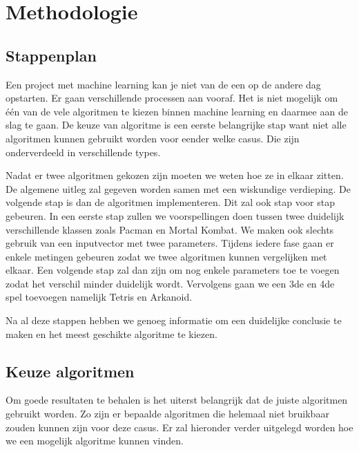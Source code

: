 
\chapter{Methodologie}
\label{ch:methodologie}


\section{Stappenplan}
\label{sec:stappenplan}
Een project met machine learning kan je niet van de een op de andere dag opstarten. Er gaan verschillende processen aan vooraf. Het is niet mogelijk om één van de vele algoritmen te kiezen binnen machine learning en daarmee aan de slag te gaan. De keuze van algoritme is een eerste belangrijke stap want niet alle algoritmen kunnen gebruikt worden voor eender welke casus. Die zijn onderverdeeld in verschillende types. 

Nadat er twee algoritmen gekozen zijn moeten we weten hoe ze in elkaar zitten. De algemene uitleg zal gegeven worden samen met een wiskundige verdieping. 
De volgende stap is dan de algoritmen implementeren. Dit zal ook stap voor stap gebeuren. In een eerste stap zullen we voorspellingen doen tussen twee duidelijk verschillende klassen zoals Pacman en Mortal Kombat. We maken ook slechts gebruik van een inputvector met twee parameters. Tijdens iedere fase gaan er enkele metingen gebeuren zodat we twee algoritmen kunnen vergelijken met elkaar. Een volgende stap zal dan zijn om nog enkele parameters toe te voegen zodat het verschil minder duidelijk wordt. Vervolgens gaan we een 3de en 4de spel toevoegen namelijk Tetris en Arkanoid. 

Na al deze stappen hebben we genoeg informatie om een duidelijke conclusie te maken en het meest geschikte algoritme te kiezen. 



\section{Keuze algoritmen}
\label{sec:keuze-algoritmen}
Om goede resultaten te behalen is het uiterst belangrijk dat de juiste algoritmen gebruikt worden. Zo zijn er bepaalde algoritmen die helemaal niet bruikbaar zouden kunnen zijn voor deze casus. Er zal hieronder verder uitgelegd worden hoe we een mogelijk algoritme kunnen vinden.

